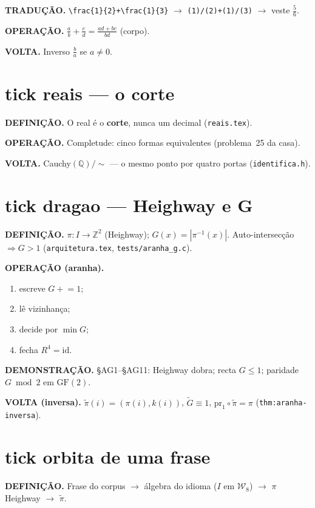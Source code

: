 \documentclass[11pt,a4paper]{article}
\newcommand{\code}[1]{\texttt{\small #1}}
\newcommand{\Word}{\mathcal{W}}
\begin{document}
\textbf{TRADUÇÃO.} \verb|\frac{1}{2}+\frac{1}{3}| $\to$ \texttt{(1)/(2)+(1)/(3)}
$\to$ veste $\frac{5}{6}$.

\textbf{OPERAÇÃO.} $\frac{a}{b}+\frac{c}{d}=\frac{ad+bc}{bd}$ (corpo).

\textbf{VOLTA.} Inverso $\frac{b}{a}$ se $a\neq0$.

\section{tick reais --- o corte}\label{sec:tick-R}
\textbf{DEFINIÇÃO.} O real é o \textbf{corte}, nunca um decimal
(\code{reais.tex}).

\textbf{OPERAÇÃO.} Completude: cinco formas equivalentes (problema~25 da casa).

\textbf{VOLTA.} Cauchy$(\mathbb{Q})/{\sim}$ --- o mesmo ponto por quatro portas
(\code{identifica.h}).

\section{tick dragao --- Heighway e G}\label{sec:tick-dragao}
\textbf{DEFINIÇÃO.} $\pi\colon I\to\mathbb{Z}^{2}$ (Heighway);
$G(x)=|\pi^{-1}(x)|$. Auto-intersecção $\Rightarrow G>1$
(\code{arquitetura.tex}, \code{tests/aranha\_g.c}).

\textbf{OPERAÇÃO (aranha).}
\begin{enumerate}\itemsep2pt
\item escreve $G\mathrel{+}=1$;
\item lê vizinhança;
\item decide por $\min G$;
\item fecha $R^{4}=\mathrm{id}$.
\end{enumerate}

\textbf{DEMONSTRAÇÃO.} §AG1--§AG11: Heighway dobra; recta $G\le1$; paridade
$G\bmod2$ em $\mathrm{GF}(2)$.

\textbf{VOLTA (inversa).} $\tilde\pi(i)=(\pi(i),k(i))$, $\tilde G\equiv1$,
$\mathrm{pr}_{1}\circ\tilde\pi=\pi$ (\code{thm:aranha-inversa}).

\section{tick orbita de uma frase}\label{sec:tick-frase}
\textbf{DEFINIÇÃO.} Frase do corpus $\to$ álgebra do idioma ($I$ em
$\Word_8$) $\to$ $\pi$ Heighway $\to$ $\tilde\pi$.
\end{document}
